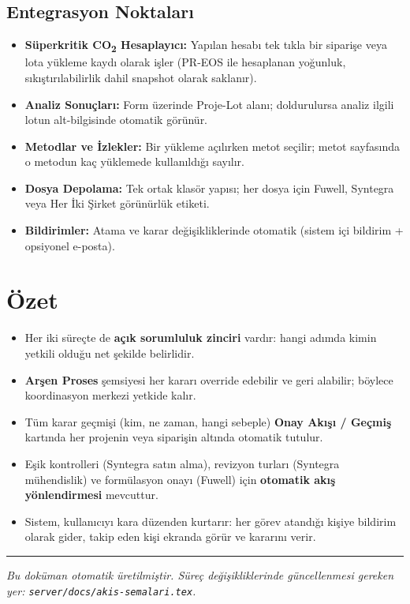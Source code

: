 \documentclass[11pt,a4paper]{article}
\begin{document}
\subsection{Entegrasyon Noktaları}

\begin{itemize}
  \item \textbf{Süperkritik CO\textsubscript{2} Hesaplayıcı:} Yapılan hesabı tek
        tıkla bir siparişe veya lota yükleme kaydı olarak işler (PR-EOS ile
        hesaplanan yoğunluk, sıkıştırılabilirlik dahil snapshot olarak
        saklanır).
  \item \textbf{Analiz Sonuçları:} Form üzerinde Proje-Lot alanı; doldurulursa
        analiz ilgili lotun alt-bilgisinde otomatik görünür.
  \item \textbf{Metodlar ve İzlekler:} Bir yükleme açılırken metot seçilir;
        metot sayfasında o metodun kaç yüklemede kullanıldığı sayılır.
  \item \textbf{Dosya Depolama:} Tek ortak klasör yapısı; her dosya için
        Fuwell, Syntegra veya Her İki Şirket görünürlük etiketi.
  \item \textbf{Bildirimler:} Atama ve karar değişikliklerinde otomatik (sistem
        içi bildirim + opsiyonel e-posta).
\end{itemize}

\newpage

\section{Özet}

\begin{itemize}
  \item Her iki süreçte de \textbf{açık sorumluluk zinciri} vardır: hangi adımda
        kimin yetkili olduğu net şekilde belirlidir.
  \item \textbf{Arşen Proses} şemsiyesi her kararı override edebilir ve geri
        alabilir; böylece koordinasyon merkezi yetkide kalır.
  \item Tüm karar geçmişi (kim, ne zaman, hangi sebeple) \textbf{Onay Akışı /
        Geçmiş} kartında her projenin veya siparişin altında otomatik tutulur.
  \item Eşik kontrolleri (Syntegra satın alma), revizyon turları (Syntegra
        mühendislik) ve formülasyon onayı (Fuwell) için \textbf{otomatik akış
        yönlendirmesi} mevcuttur.
  \item Sistem, kullanıcıyı kara düzenden kurtarır: her görev atandığı kişiye
        bildirim olarak gider, takip eden kişi ekranda görür ve kararını verir.
\end{itemize}

\vspace{1cm}
\hrule
\vspace{0.4cm}
\noindent\small\textit{Bu doküman otomatik üretilmiştir. Süreç değişikliklerinde
güncellenmesi gereken yer: \texttt{server/docs/akis-semalari.tex}.}
\end{document}
